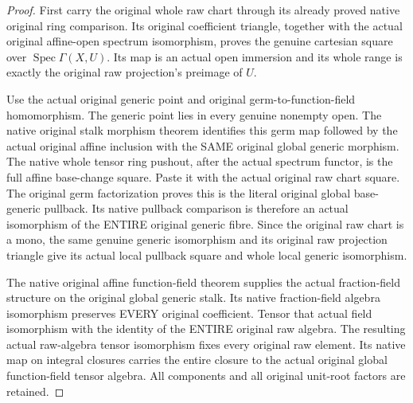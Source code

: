 \begin{proof}
First carry the original whole raw chart through its already proved native
original ring comparison. Its original coefficient triangle, together with
the actual original affine-open spectrum isomorphism, proves the genuine
cartesian square over $\operatorname{Spec}\Gamma(X,U)$. Its map is an actual
open immersion and its whole range is exactly the original raw projection's
preimage of $U$.

Use the actual original generic point and original germ-to-function-field
homomorphism. The generic point lies in every genuine nonempty open. The
native original stalk morphism theorem identifies this germ map followed by
the actual original affine inclusion with the SAME original global generic
morphism. The native whole tensor ring pushout, after the actual spectrum
functor, is the full affine base-change square. Paste it with the actual
original raw chart square. The original germ factorization proves this is the
literal original global base-generic pullback. Its native pullback comparison
is therefore an actual isomorphism of the ENTIRE original generic fibre.
Since the original raw chart is a mono, the same genuine generic isomorphism
and its original raw projection triangle give its actual local pullback
square and whole local generic isomorphism.

The native original affine function-field theorem supplies the actual
fraction-field structure on the original global generic stalk. Its native
fraction-field algebra isomorphism preserves EVERY original coefficient.
Tensor that actual field isomorphism with the identity of the ENTIRE original
raw algebra. The resulting actual raw-algebra tensor isomorphism fixes every
original raw element. Its native map on integral closures carries the entire
closure to the actual original global function-field tensor algebra. All
components and all original unit-root factors are retained.
\end{proof}


